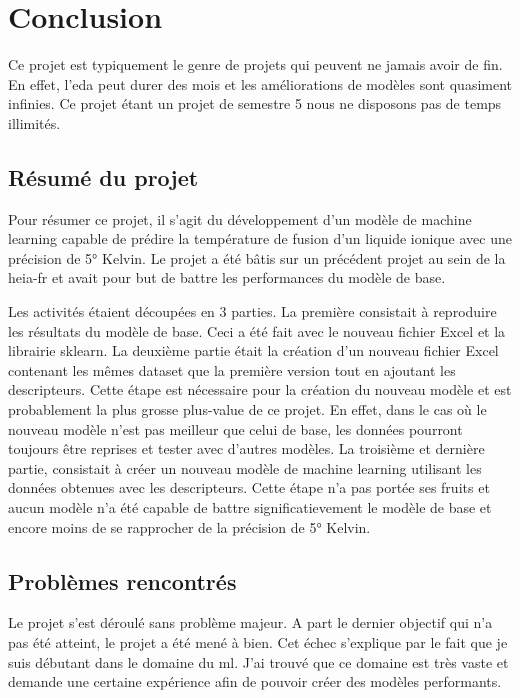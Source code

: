 \chapter{Conclusion}
\label{chap:conclusion}
Ce projet est typiquement le genre de projets qui peuvent ne jamais avoir de fin.
En effet, l'\acrshort{eda} peut durer des mois et les améliorations de modèles sont quasiment infinies.
Ce projet étant un projet de semestre 5 nous ne disposons pas de temps illimités.

\section{Résumé du projet}
Pour résumer ce projet, il s'agit du développement d'un modèle de machine learning capable de prédire la température de fusion d'un liquide ionique avec une précision de 5° Kelvin.
Le projet a été bâtis sur un précédent projet au sein de la \acrshort{heia-fr} et avait pour but de battre les performances du modèle de base.

Les activités étaient découpées en 3 parties.
La première consistait à reproduire les résultats du modèle de base.
Ceci a été fait avec le nouveau fichier Excel et la librairie \acrshort{sklearn}.
La deuxième partie était la création d'un nouveau fichier Excel contenant les mêmes dataset que la première version tout en ajoutant les descripteurs.
Cette étape est nécessaire pour la création du nouveau modèle et est probablement la plus grosse plus-value de ce projet.
En effet, dans le cas où le nouveau modèle n'est pas meilleur que celui de base, les données pourront toujours être reprises et tester avec d'autres modèles.
La troisième et dernière partie, consistait à créer un nouveau modèle de machine learning utilisant les données obtenues avec les descripteurs.
Cette étape n'a pas portée ses fruits et aucun modèle n'a été capable de battre significatievement le modèle de base et encore moins de se rapprocher de la précision de 5° Kelvin.


\section{Problèmes rencontrés}
Le projet s'est déroulé sans problème majeur. A part le dernier objectif qui n'a pas été atteint, le projet a été mené à bien.
Cet échec s'explique par le fait que je suis débutant dans le domaine du \acrlong{ml}.
J'ai trouvé que ce domaine est très vaste et demande une certaine expérience afin de pouvoir créer des modèles performants.

